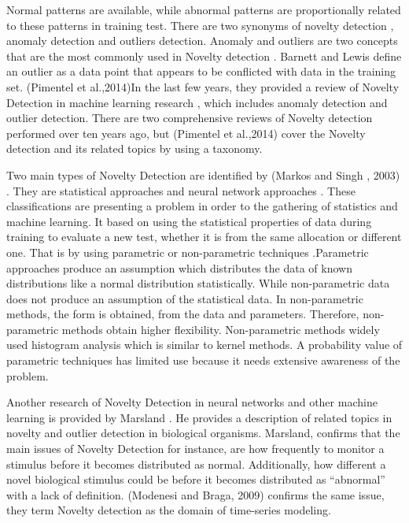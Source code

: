 \documentclass[conference]{IEEEtran}
\begin{document}
Normal patterns are available, while abnormal patterns are proportionally related to these patterns in training test. There are two synonyms of novelty detection \cite{tarassenko1995novelty} \cite{bishop1994novelty}, anomaly detection and outliers detection\cite{ritter1997outliers}. Anomaly and outliers are two concepts that are the most commonly used in Novelty detection \cite{chandola2009anomaly} \cite{chandola2007outlier}. Barnett and Lewis \cite{barnett1994outliers} define an outlier as a data point that appears to be conflicted with data in the training set. (Pimentel et al.,2014)In the last few years, they provided a review of Novelty Detection in machine learning research \cite{pimentel2014review}, which includes anomaly detection and outlier detection. There are two comprehensive reviews of Novelty detection \cite{markou2003novelty} \cite{markou2003novelty} performed over ten years ago, but (Pimentel et al.,2014) \cite{pimentel2014review} cover the Novelty detection and its related topics by using a taxonomy. 
 



\par Two main types of Novelty Detection are identified by (Markos and Singh , 2003) \cite{markou2003novelty}. They are  statistical approaches  \cite{markou2003novelty}and neural network approaches \cite{markou2003novelty}. These classifications are presenting a problem in order to the gathering of statistics and machine learning. It based on using the statistical properties of data during training to evaluate a new test, whether it is from the same allocation or different one. That is by using parametric or non-parametric techniques \cite{duda2012pattern} \cite{bishop1995neural} \cite{desforges1998applications}.Parametric approaches produce an assumption which distributes the data of known distributions like a normal distribution statistically. While non-parametric data does not produce an assumption of the statistical data. In non-parametric methods, the form is obtained, from the data and parameters. Therefore, non-parametric methods obtain higher flexibility. Non-parametric methods widely used histogram analysis which is similar to kernel methods. A probability value of parametric techniques has limited use because it needs extensive awareness of the problem.



\par Another research of Novelty Detection in neural networks and other machine learning is provided by Marsland \cite{marsland2003novelty}. He provides a description of related topics in novelty and outlier detection in biological organisms. Marsland, confirms that the main issues of Novelty Detection for instance, are how frequently to monitor a stimulus before it becomes distributed as normal. Additionally, how different a novel biological stimulus could be before it becomes distributed as “abnormal” with a lack of definition. (Modenesi and Braga, 2009) \cite{modenesi2009analysis} confirms the same issue, they term Novelty detection as the domain of time-series modeling.
\end{document}
